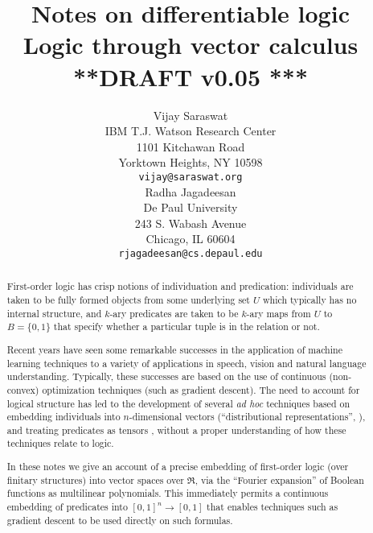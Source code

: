 \documentclass{article} %
\newcommand{\keywords}[1]{\par\addvspace\baselineskip
\noindent\keywordname\enspace\ignorespaces#1}
\begin{document}
%

\long{}
\def\mtimes{}
\def\LL#1{#1}
\title{Notes on differentiable logic \\
{\small Logic through vector calculus} \\
{\small ***DRAFT v0.05 ***}}

\author{Vijay Saraswat \\
IBM T.J. Watson Research Center\\
1101 Kitchawan Road\\
Yorktown Heights, NY 10598 \\
\texttt{vijay@saraswat.org} \\
\And
Radha Jagadeesan \\
De Paul University \\
243 S. Wabash Avenue \\
Chicago, IL 60604 \\
\texttt{rjagadeesan@cs.depaul.edu}
}

\newcommand{\fix}{\marginpar{FIX}}
\newcommand{\new}{\marginpar{NEW}}

\nipsfinalcopy %

\maketitle

\begin{abstract}
First-order logic has crisp notions of individuation and predication: individuals are taken  to be fully formed objects from some underlying set $U$ which typically has no internal structure, and $k$-ary predicates are taken to be $k$-ary maps from $U$ to $B=\{0,1\}$ that specify whether a particular tuple is in the relation or not. 

Recent years have seen some remarkable successes in the application of machine learning techniques to a variety of applications in speech, vision and natural language understanding. Typically, these successes are based on the use of continuous (non-convex) optimization techniques (such as gradient descent). The need to account for logical structure has led to the development of several {\em ad hoc} techniques based on embedding individuals into $n$-dimensional vectors (``distributional representations'', \cite{unified-arch-nlp,mikolov-word-vec,baroni2014don}), and treating predicates as tensors \cite{coecke-2010,grefenstette-2013,socher-ntn-2013,bishan-iclr15,rocktaschel-2015,order-embedding-kiros,TransIE}, without a proper understanding of how these techniques relate to logic. 

In these notes we give an account of a precise embedding of first-order logic (over finitary structures) into vector spaces over $\Re$, via the ``Fourier expansion'' of Boolean functions as multilinear polynomials. This immediately permits a continuous embedding of predicates into $[0,1]^n \rightarrow [0,1]$ that enables techniques such as gradient descent to be used directly on such formulas.

\end{abstract}
\end{document}
